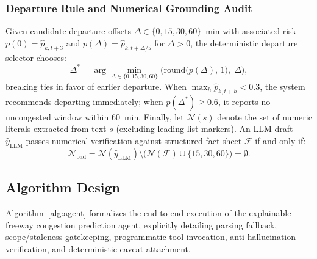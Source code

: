 \documentclass[conference]{IEEEtran}
\begin{document}
\subsubsection{Departure Rule and Numerical Grounding Audit}
Given candidate departure offsets $\Delta \in \{0, 15, 30, 60\}$~min with associated risk $p(0) = \hat{p}_{k,t+3}$ and $p(\Delta) = \hat{p}_{k,t+\Delta/5}$ for $\Delta > 0$, the deterministic departure selector chooses:
\begin{equation}
\Delta^* = \arg\min_{\Delta \in \{0,15,30,60\}} \Big(\text{round}\big(p(\Delta),\, 1\big),\; \Delta\Big),
\label{eq:depart_rule}
\end{equation}
breaking ties in favor of earlier departure. When $\max_h \hat{p}_{k,t+h} < 0.3$, the system recommends departing immediately; when $p(\Delta^*) \ge 0.6$, it reports no uncongested window within 60~min. Finally, let $\mathcal{N}(s)$ denote the set of numeric literals extracted from text $s$ (excluding leading list markers). An LLM draft $\hat{y}_{\text{LLM}}$ passes numerical verification against structured fact sheet $\mathcal{F}$ if and only if:
\begin{equation}
\mathcal{N}_{\text{bad}} = \mathcal{N}(\hat{y}_{\text{LLM}}) \setminus \Big(\mathcal{N}(\mathcal{F}) \cup \{15, 30, 60\}\Big) = \emptyset.
\label{eq:num_check}
\end{equation}

\subsection{Algorithm Design}
Algorithm~\ref{alg:agent} formalizes the end-to-end execution of the explainable freeway congestion prediction agent, explicitly detailing parsing fallback, scope/staleness gatekeeping, programmatic tool invocation, anti-hallucination verification, and deterministic caveat attachment.
\end{document}
